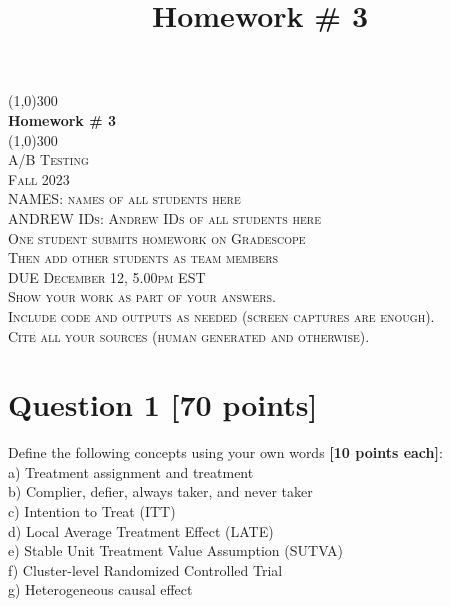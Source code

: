 \documentclass{article}
\title{Homework \# 3}
\begin{document}
\begin{titlepage}
	\begin{center}
    \line(1,0){300}\\
    [0.65cm]
	\huge{\bfseries Homework \# 3}\\
	\line(1,0){300}\\
	\textsc{\LARGE A/B Testing}\\
	\textsc{\LARGE  Fall 2023}\\
	[5.5cm]
	\textsc{\LARGE NAMES: names of all students here}\\
	\textsc{\LARGE ANDREW IDs: Andrew IDs of all students here}\\
	[1.5cm]
	\textsc{\LARGE One student submits homework on Gradescope}\\
	\textsc{\LARGE Then add other students as team members}\\
	[5.5cm]
	\textsc{DUE December 12, 5.00pm EST}\\
	[0.5cm]
	\textsc{\large Show your work as part of your answers.\\Include code and outputs as needed (screen captures are enough).\\Cite all your sources (human generated and otherwise).}\\
	\end{center}
\end{titlepage}

\section*{\color{black} Question 1 {\bf [70 points]}}

Define the following concepts using your own words {\bf [10 points each]}:\\

a) Treatment assignment and treatment\\

b) Complier, defier, always taker, and never taker\\

c) Intention to Treat (ITT)\\

d) Local Average Treatment Effect (LATE)\\

e) Stable Unit Treatment Value Assumption (SUTVA)\\

f) Cluster-level Randomized Controlled Trial\\

g) Heterogeneous causal effect\\
\end{document}
